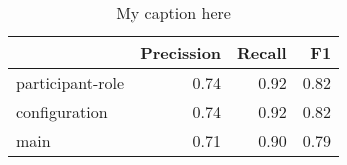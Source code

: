 \begin{table}[!ht]
\centering
\begin{tabular}{lrrr}
\toprule
{} &  Precission &  Recall &   F1 \\
\midrule
participant-role &        0.74 &    0.92 & 0.82 \\
configuration    &        0.74 &    0.92 & 0.82 \\
main             &        0.71 &    0.90 & 0.79 \\
\bottomrule
\end{tabular}
\caption{My caption here}
\label{tab:unit-elements-oe-combined-F1}
\end{table}